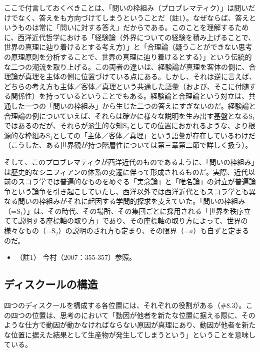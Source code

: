 ここで付言しておくべきことは、「問いの枠組み（プロブレマティク）」は問いだけでなく、答えをも方向づけてしまうということだ（註1）。なぜならば、答えというものは常に「問いに対する答え」だからである。このことを理解するために、西洋近代哲学における「経験論（外界についての経験を積み上げることで、世界の真理に辿り着けるとする考え方）」と「合理論（疑うことができない思考の原理原則を分析することで、世界の真理に辿り着けるとする）」という伝統的な二つの潮流を取り上げる。この両者の違いは、経験論が真理を客体の側に、合理論が真理を主体の側に位置づけている点にある。しかし、それは逆に言えば、どちらの考え方も主体／客体／真理という共通した語彙（および、そこに付随する関係性）を持っているということでもある。経験論と合理論という対立は、共通した一つの「問いの枠組み」から生じた二つの答えにすぎないのだ。経験論と合理論の例についていえば、それらは確かに様々な説明を生み出す基盤となる\(\textrm{S}_1\)ではあるのだが、それらが派生的な知\(\textrm{S}_2\)としての位置におかれるような、より根源的な枠組み\(\textrm{S}_1\)としての「主体／客体／真理」という語彙が存在しているわけだ（こうした、ある世界観が持つ階層性については第三章第二節で詳しく扱う）。

そして、このプロブレマティクが西洋近代のものであるように、「問いの枠組み」は歴史的なシニフィアンの体系の変遷に伴って形成されるものだ。実際、近代以前のスコラ学では普遍的なものをめぐる「実念論」と「唯名論」の対立が普遍論争という論争を引き起こしていたし、西洋以外では西洋近代ともスコラ学とも異なる問いの枠組みがそれに起因する学問的探求を支えていた。「問いの枠組み（=\(\textrm{S}_1\)）」は、その時代、その場所、その集団ごとに採用される「世界を秩序立てて説明する座標軸の取り方」であり、その座標軸の取り方によって、世界の様々なもの（=\(\textrm{S}_2\)）の説明のされ方も定まり、その限界（=\(a\)）も自ずと定まるのだ。

\begin{itemize}
\tightlist
\item
  （註1） 今村（2007：355-357）\cite{Imamura1}参照。
\end{itemize}

\subsection{ディスクールの構造}\label{ux30c7ux30a3ux30b9ux30afux30fcux30ebux306eux69cbux9020}

四つのディスクールを構成する各位置には、それぞれの役割がある（\#8.3）。この四つの位置は、思考のにおいて「動因が他者を新たな位置に据える際に、そのような仕方で動因が動かなければならない原因が真理にあり、動因が他者を新たな位置に据えた結果として生産物が発生してしまうという」ということを意味している。

